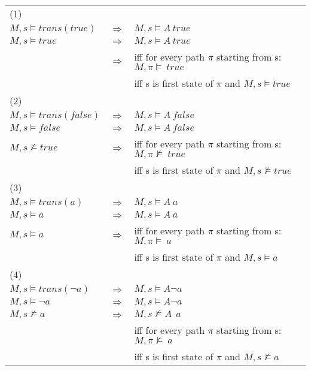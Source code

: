 \begin{tabular}{l l l}
\hline
\hline
(1) & & \\
$M,s\models trans(true)$ & $ \Rightarrow $ & $ M,s\models A\ true$ \\
$M,s\models true $ & $ \Rightarrow $ & $ M,s\models A\ true$ \\
 & $\Rightarrow$ & iff for every path $\pi$ starting from s: $M,\pi \models\ true$ \\
 & & iff s is first state of $\pi$ and $M,s\models true$ \\
\hline
\hline
(2) & & \\
$M,s\models trans(false)$ & $ \Rightarrow $ & $ M,s\models A\ false$ \\
$M,s\models false $ & $ \Rightarrow $ & $ M,s\models A\ false$ \\
$M,s\not\models true$ & $\Rightarrow$ & iff for every path $\pi$ starting from s: $M,\pi \not\models\ true$ \\
 & & iff s is first state of $\pi$ and $M,s\not\models true$ \\
\hline
\hline
(3) & & \\
$M,s\models trans(a)$ & $ \Rightarrow $ & $ M,s\models A\ a$ \\
$M,s\models a $ & $ \Rightarrow $ & $ M,s\models A\ a$ \\
$M,s\models a$ & $\Rightarrow$ & iff for every path $\pi$ starting from s: $M,\pi \models\ a$ \\
 & & iff s is first state of $\pi$ and $M,s\models a$ \\
\hline
\hline
(4) & & \\
$M,s\models trans(\neg a)$ & $ \Rightarrow $ & $ M,s\models A\neg a$ \\
$M,s\models \neg a $ & $ \Rightarrow $ & $ M,s\models A\neg a$ \\
$M,s\not\models a$ & $\Rightarrow$ & $M,s\not\models A\ \ a$ \\
& & iff for every path $\pi$ starting from s: $M,\pi \not\models\ a$ \\
 & & iff s is first state of $\pi$ and $M,s\not\models a$ \\
\end{tabular}
\\
